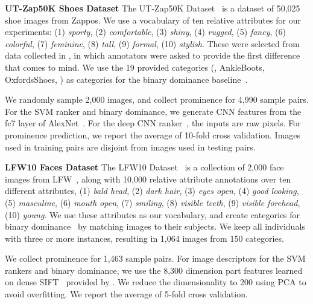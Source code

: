 \documentclass[10pt,twocolumn,letterpaper]{article}
\begin{document}
\noindent \textbf{UT-Zap50K Shoes Dataset} \hspace{1em} The UT-Zap50K Dataset~\cite{finegrained} is a dataset of 50,025 shoe images from Zappos. We use a vocabulary of ten relative attributes for our experiments: (1) \textit{sporty}, (2) \textit{comfortable}, (3) \textit{shiny}, (4) \textit{rugged}, (5) \textit{fancy}, (6) \textit{colorful}, (7) \textit{feminine}, (8) \textit{tall}, (9) \textit{formal}, (10) \textit{stylish}. These were selected from data collected in \cite{semanticjitter}, in which annotators were asked to provide the first difference that comes to mind. We use the 19 provided categories (\eg, AnkleBoots, OxfordsShoes, \etc) as categories for the binary dominance baseline~\cite{dominance}.

We randomly sample 2,000 images, and collect prominence for 4,990 sample pairs. For the SVM ranker and binary dominance, we generate CNN features from the fc7 layer of AlexNet~\cite{alexnet}. For the deep CNN ranker~\cite{deeprelative}, the inputs are raw pixels. For prominence prediction, we report the average of 10-fold cross validation. Images used in training pairs are disjoint from images used in testing pairs.

\vspace{0.22cm}

\noindent \textbf{LFW10 Faces Dataset} \hspace{1em} The LFW10 Dataset~\cite{relativeparts} is a collection of 2,000 face images from LFW~\cite{lfw}, along with 10,000 relative attribute annotations over ten different attributes, (1) \textit{bald head}, (2) \textit{dark hair}, (3) \textit{eyes open}, (4) \textit{good looking}, (5) \textit{masculine}, (6) \textit{mouth open}, (7) \textit{smiling}, (8) \textit{visible teeth}, (9) \textit{visible forehead}, (10) \textit{young}. We use these attributes as our vocabulary, and create categories for binary dominance~\cite{dominance} by matching images to their subjects. We keep all individuals with three or more instances, resulting in 1,064 images from 150 categories.

We collect prominence for 1,463 sample pairs. For image descriptors for the SVM rankers and binary dominance, we use the 8,300 dimension part features learned on dense SIFT~\cite{sift} provided by \cite{relativeparts}. We reduce the dimensionality to 200 using PCA to avoid overfitting. We report the average of 5-fold cross validation.

\vspace{0.22cm}
\end{document}
